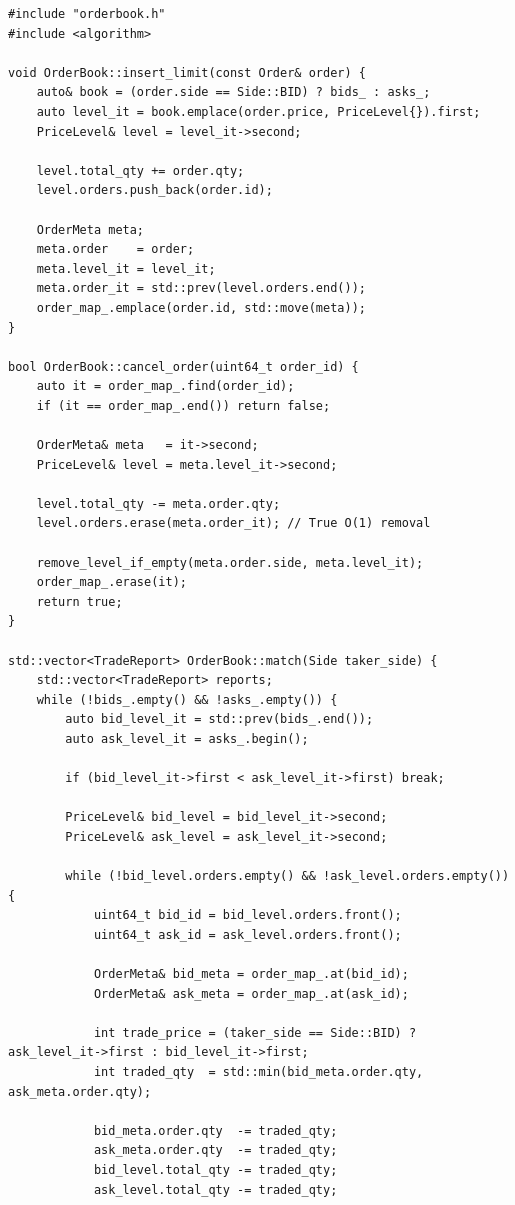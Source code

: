\documentclass{article}
\begin{document}
\begin{lstlisting}[caption={Phase 3 Matching and Immediate Cancellation Logic (orderbook.cpp)}]
#include "orderbook.h"
#include <algorithm>

void OrderBook::insert_limit(const Order& order) {
    auto& book = (order.side == Side::BID) ? bids_ : asks_;
    auto level_it = book.emplace(order.price, PriceLevel{}).first;
    PriceLevel& level = level_it->second;

    level.total_qty += order.qty;
    level.orders.push_back(order.id);

    OrderMeta meta;
    meta.order    = order;
    meta.level_it = level_it;
    meta.order_it = std::prev(level.orders.end());
    order_map_.emplace(order.id, std::move(meta));
}

bool OrderBook::cancel_order(uint64_t order_id) {
    auto it = order_map_.find(order_id);
    if (it == order_map_.end()) return false;

    OrderMeta& meta   = it->second;
    PriceLevel& level = meta.level_it->second;

    level.total_qty -= meta.order.qty;
    level.orders.erase(meta.order_it); // True O(1) removal

    remove_level_if_empty(meta.order.side, meta.level_it);
    order_map_.erase(it);
    return true;
}

std::vector<TradeReport> OrderBook::match(Side taker_side) {
    std::vector<TradeReport> reports;
    while (!bids_.empty() && !asks_.empty()) {
        auto bid_level_it = std::prev(bids_.end());
        auto ask_level_it = asks_.begin();

        if (bid_level_it->first < ask_level_it->first) break;

        PriceLevel& bid_level = bid_level_it->second;
        PriceLevel& ask_level = ask_level_it->second;

        while (!bid_level.orders.empty() && !ask_level.orders.empty()) {
            uint64_t bid_id = bid_level.orders.front();
            uint64_t ask_id = ask_level.orders.front();

            OrderMeta& bid_meta = order_map_.at(bid_id);
            OrderMeta& ask_meta = order_map_.at(ask_id);

            int trade_price = (taker_side == Side::BID) ? ask_level_it->first : bid_level_it->first;
            int traded_qty  = std::min(bid_meta.order.qty, ask_meta.order.qty);

            bid_meta.order.qty  -= traded_qty;
            ask_meta.order.qty  -= traded_qty;
            bid_level.total_qty -= traded_qty;
            ask_level.total_qty -= traded_qty;


\end{lstlisting}
\end{document}
